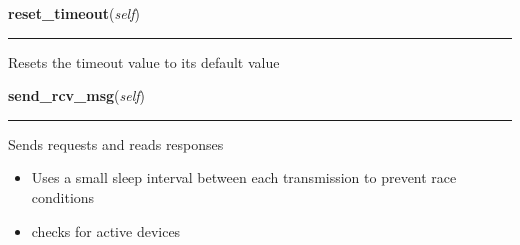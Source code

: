     \label{sensor_thread:Sensor:reset_timeout}

    \vspace{0.5ex}

\hspace{.8\funcindent}\begin{boxedminipage}{\funcwidth}

    \raggedright \textbf{reset\_timeout}(\textit{self})

    \vspace{-1.5ex}

    \rule{\textwidth}{0.5\fboxrule}
\setlength{\parskip}{2ex}
    Resets the timeout value to its default value

\setlength{\parskip}{1ex}
    \end{boxedminipage}

    \label{sensor_thread:Sensor:send_rcv_msg}

    \vspace{0.5ex}

\hspace{.8\funcindent}\begin{boxedminipage}{\funcwidth}

    \raggedright \textbf{send\_rcv\_msg}(\textit{self})

    \vspace{-1.5ex}

    \rule{\textwidth}{0.5\fboxrule}
\setlength{\parskip}{2ex}
    Sends requests and reads responses

    \begin{itemize}
    \setlength{\parskip}{0.6ex}
      \item Uses a small sleep interval between each transmission to prevent 
        race conditions

      \item checks for active devices

    \end{itemize}

\setlength{\parskip}{1ex}
    \end{boxedminipage}

    \label{sensor_thread:Sensor:set_db_data}

